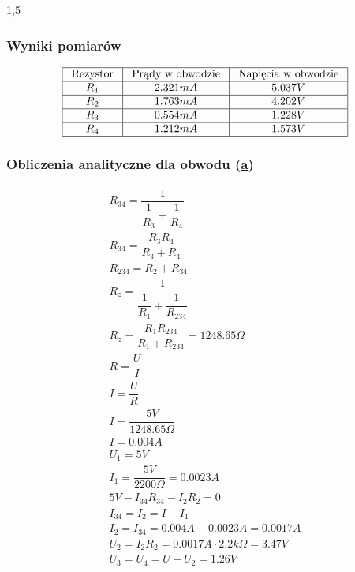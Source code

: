 \documentclass[polish,polish,a4paper]{article}
\begin{document}
\begin{spacing}{1,5}
		\subsubsection*{Wyniki pomiarów}
		
		\begin{equation*}
		\begin{array}{|c|c|c|}
		\hline
		$ Rezystor $&$ Prądy w obwodzie $&$ Napięcia w obwodzie $\\
		\hline
		R_{1}&2.321mA&5.037V\\
		\hline
		R_{2}&1.763mA&4.202V\\
		\hline
		R_{3}&0.554mA&1.228V\\
		\hline
		R_{4}&1.212mA&1.573V\\
		\hline
		\end{array}
		\end{equation*}
		
				
		\subsubsection*{Obliczenia analityczne dla obwodu (\hyperref[eq:ob2a]{a})}
		
		\begin{gather*}
		R_{34} =\dfrac{1}{\dfrac{1}{R_{3}} + \dfrac{1}{R_{4}}}\\
		R_{34} = \dfrac{R_{3}R_{4}}{R_{3}+R_{4}}\\
		R_{234} = R_{2} + R_{34}\\
		R_{z} = \dfrac{1}{\dfrac{1}{R_{1}} + \dfrac{1}{R_{234}}}\\
		R_{z} = \dfrac{R_{1}R_{234}}{R_{1}+R_{234}} = 1248.65\Omega\\
		R=\dfrac{U}{I}\\
		I=\dfrac{U}{R}\\
		I=\dfrac{5V}{1248.65\Omega}\\
		I=0.004A\\
		U_{1} = 5V\\
		I_{1} = \dfrac{5V}{2200\Omega} = 0.0023A\\
		5V - I_{34}R_{34} - I_{2}R_{2} = 0\\
		I_{34} = I_{2} = I - I_{1}\\
		I_{2} = I_{34} = 0.004A - 0.0023A = 0.0017A\\
		U_{2} = I_{2}R_{2} = 0.0017A \cdot 2.2k\Omega = 3.47V\\
		U_{3} = U_{4} = U - U_{2} = 1.26V
		\end{gather*}
		

\end{spacing}
\end{document}
